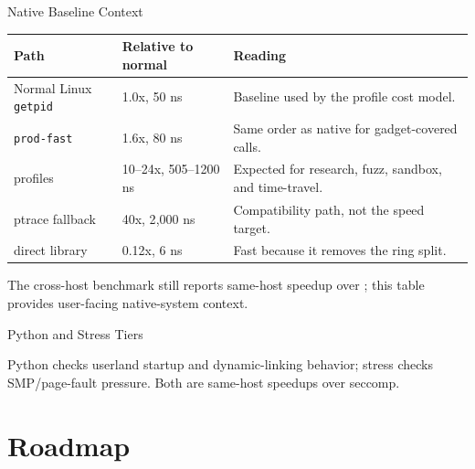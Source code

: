 \documentclass[aspectratio=169,11pt]{beamer}
\begin{document}
\begin{frame}{Native Baseline Context}
\small
\begin{tabularx}{\textwidth}{@{}p{}p{}X@{}}
\toprule
Path & Relative to normal & Reading \\
\midrule
Normal Linux \texttt{getpid} & 1.0x, 50 ns & Baseline used by the profile cost model. \\
\KVMvTwo{} \texttt{prod-fast} & 1.6x, 80 ns & Same order as native for gadget-covered calls. \\
\Seccomp{} profiles & 10--24x, 505--1200 ns & Expected for research, fuzz, sandbox, and time-travel. \\
ptrace fallback & 40x, 2{,}000 ns & Compatibility path, not the speed target. \\
direct library & 0.12x, 6 ns & Fast because it removes the ring split. \\
\bottomrule
\end{tabularx}
\vspace{0.7em}

\scriptsize
The cross-host benchmark still reports same-host speedup over
\Seccomp{}; this table provides user-facing native-system context.
\end{frame}

\begin{frame}{Python and Stress Tiers}
\centering
{}
\vspace{0.3em}

\scriptsize
Python checks userland startup and dynamic-linking behavior; stress
checks SMP/page-fault pressure. Both are same-host speedups over seccomp.
\end{frame}

\section{Roadmap}
\end{document}
